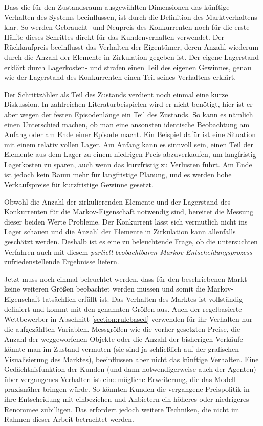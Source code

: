 Dass die für den Zustandsraum ausgewählten Dimensionen das künftige Verhalten des Systems beeinflussen, ist durch die Definition des Marktverhaltens klar.
So werden Gebraucht- und Neupreis des Konkurrenten noch für die erste Hälfte dieses Schrittes direkt für das Kundenverhalten verwendet.
Der Rückkaufpreis beeinflusst das Verhalten der Eigentümer, deren Anzahl wiederum durch die Anzahl der Elemente in Zirkulation gegeben ist.
Der eigene Lagerstand erklärt durch Lagerkosten- und strafen einen Teil des eigenen Gewinnes, genau wie der Lagerstand des Konkurrenten einen Teil seines Verhaltens erklärt.

Der Schrittzähler als Teil des Zustands verdient noch einmal eine kurze Diskussion.
In zahlreichen Literaturbeispielen wird er nicht benötigt, hier ist er aber wegen der festen Episodenlänge ein Teil des Zustands.
So kann es nämlich einen Unterschied machen, ob man eine ansonsten identische Beobachtung am Anfang oder am Ende einer Episode macht.
Ein Beispiel dafür ist eine Situation mit einem relativ vollen Lager.
Am Anfang kann es sinnvoll sein, einen Teil der Elemente aus dem Lager zu einem niedrigen Preis abzuverkaufen, um langfristig Lagerkosten zu sparen, auch wenn das kurzfristig zu Verlusten führt.
Am Ende ist jedoch kein Raum mehr für langfristige Planung, und es werden hohe Verkaufspreise für kurzfristige Gewinne gesetzt.

Obwohl die Anzahl der zirkulierenden Elemente und der Lagerstand des Konkurrenten für die Markov-Eigenschaft notwendig sind, bereitet die Messung dieser beiden Werte Probleme.
Der Konkurrent lässt sich vermutlich nicht ins Lager schauen und die Anzahl der Elemente in Zirkulation kann allenfalls geschätzt werden.
Deshalb ist es eine zu beleuchtende Frage, ob die untersuchten Verfahren auch mit diesem \textit{partiell beobachtbaren Markov-Entscheidungsprozess} zufriedenstellende Ergebnisse liefern.

Jetzt muss noch einmal beleuchtet werden, dass für den beschriebenen Markt keine weiteren Größen beobachtet werden müssen und somit die Markov-Eigenschaft tatsächlich erfüllt ist.
Das Verhalten des Marktes ist vollständig definiert und kommt mit den genannten Größen aus.
Auch der regelbasierte Wettbewerber in Abschnitt \ref{section:rulebased} verwenden für ihr Verhalten nur die aufgezählten Variablen.
Messgrößen wie die vorher gesetzten Preise, die Anzahl der weggeworfenen Objekte oder die Anzahl der bisherigen Verkäufe könnte man im Zustand vermuten (sie sind ja schließlich auf der grafischen Visualisierung des Marktes), beeinflussen aber nicht das künftige Verhalten.
Eine Gedächtnisfunktion der Kunden (und dann notwendigerweise auch der Agenten) über vergangenes Verhalten ist eine mögliche Erweiterung, die das Modell praxisnäher bringen würde.
So könnten Kunden die vergangene Preispolitik in ihre Entscheidung mit einbeziehen und Anbietern ein höheres oder niedrigeres Renommee zubilligen.
Das erfordert jedoch weitere Techniken, die nicht im Rahmen dieser Arbeit betrachtet werden.

